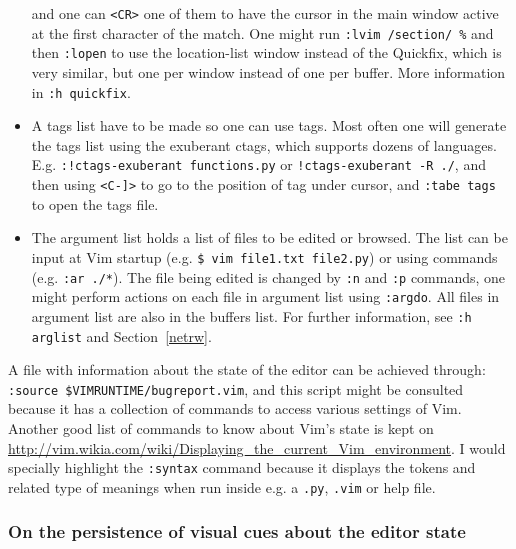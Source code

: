 \documentclass{article}
\newcommand{\ttt}[1] {
	\texttt{<#1>}}
\newcommand{\tttt}[1]{\texttt{#1}}
\begin{document}
\begin{itemize}
		and one can \ttt{CR} one of them to have the cursor in the main window active at
		the first character of the match.
		One might run \tttt{:lvim /section/ \%} and then \tttt{:lopen}
		to use the location-list window instead of the Quickfix, which
		is very similar, but one per window instead of one per buffer.
		More information in \tttt{:h quickfix}.
	\item A tags list have to be made so one can use tags.
		Most often one will generate the tags list using the exuberant ctags,
		which supports dozens of languages.
		E.g. \tttt{:!ctags-exuberant functions.py} or \tttt{!ctags-exuberant -R ./},
		and then using \ttt{C-]} to
		go to the position of tag under cursor, and \tttt{:tabe tags} to open
		the tags file.
	\item The argument list holds a list of files to be edited or browsed. 
		The list can be input at Vim startup (e.g. \tttt{\$ vim file1.txt file2.py})
	or using commands (e.g. \tttt{:ar ./*}).
		The file being edited is changed by \tttt{:n} and \tttt{:p} commands,
		one might perform actions on each file in argument list using \tttt{:argdo}.
		All files in argument list are also in the buffers list.
    For further information, see \tttt{:h arglist} and Section~\ref{netrw}.
\end{itemize}

A file with information about the state of the editor
can be achieved through: \tttt{:source \$VIMRUNTIME/bugreport.vim},
and this script might be consulted because it has
a collection of commands to access various settings of Vim.
Another good list of commands to know about Vim's state is kept on
\url{http://vim.wikia.com/wiki/Displaying_the_current_Vim_environment}.
I would specially highlight the \tttt{:syntax} command because
it displays the tokens and related type of meanings when run
inside e.g. a \tttt{.py}, \tttt{.vim} or help file.

\subsubsection{On the persistence of visual cues about the editor state}\label{visual1}
\end{document}
